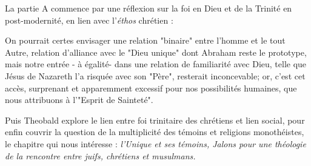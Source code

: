 La partie A commence par une réflexion  sur la foi en Dieu et de la Trinité en post-modernité, en lien avec l'\textit{éthos} chrétien : 
\begin{comment}
 Je voudrais donc penser la marque eschatologique de l'éthos chrétien comme \textit{lien constitutif} entre l'accès de la foi \textit{en l'intimité} même de "Dieu" visée par le vocabulaire de la "sainteté", et une réflexion engagée, par définition sans garantie, du sujet croyant  sur lui-même et sur l'Eglise \textit{dans la cité et dans l'histoire}. [\ldots]
\end{comment}
\begin{comment}
 
    Or, cette forme de vie - l'éthos chrétien - se caractérise en définitive par ce que la tradition biblique appelle "sainteté" : 
    \textit{dire Dieu est alors une manière de désigner la sainteté comme mystère du monde et de l'histoire} \cite[p. 705]{theobald_christianisme_2007}
     La \textit{règle dogmatique } implique à sa racine la \textit{force d'effacement} de l'Eglise au service d'une 
\end{comment}
\begin{comment}
   
    Comment caractériser « l’accès à la foi au Christ, compte tenu du point de départ éthique de la christologie, appelé par nos sociétés néo-libérales toujours tentées d’oublier les menaces qui continuent à peser sur le lien social ? On peut, dans la perspective d’une christologie pratique, le définir comme ‘mue d’identité’ qui s’exprime par le passage à un\textit{ style de vie messianique}, à une manière spécifique de se situer dans la société globale » (style**, 813).
 
\end{comment}

\begin{singlequote}
    On pourrait certes envisager une relation "binaire" entre l'homme et le tout Autre, relation d'alliance avec le "Dieu unique" dont Abraham reste le prototype, mais notre entrée - à égalité\;- dans une relation de familiarité avec Dieu, telle que Jésus de Nazareth l'a risquée avec son "Père", resterait inconcevable; or, c'est cet accès, surprenant et apparemment excessif pour nos possibilités humaines, que nous attribuons à l'"Esprit de Sainteté". \cite[p. 705]{theobald_christianisme_2007}
 \end{singlequote}
 
 Puis Theobald explore le lien entre foi trinitaire des chrétiens et lien social, pour enfin couvrir la question de la multiplicité des témoins et religions monothéistes, le chapitre qui nous intéresse : \textit{ l'Unique et ses témoins, Jalons pour une théologie de la rencontre entre juifs, chrétiens et musulmans.}

